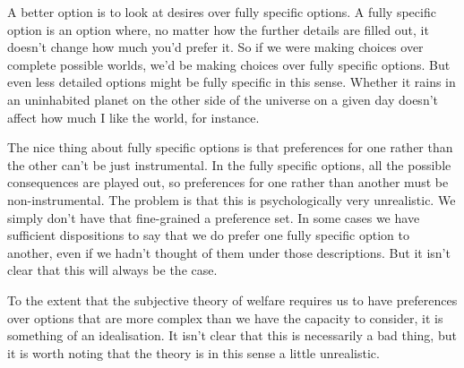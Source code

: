 A better option is to look at desires over fully specific options. A fully specific option is an option where, no matter how the further details are filled out, it doesn't change how much you'd prefer it. So if we were making choices over complete possible worlds, we'd be making choices over fully specific options. But even less detailed options might be fully specific in this sense. Whether it rains in an uninhabited planet on the other side of the universe on a given day doesn't affect how much I like the world, for instance.

The nice thing about fully specific options is that preferences for one rather than the other can't be just instrumental. In the fully specific options, all the possible consequences are played out, so preferences for one rather than another must be non-instrumental. The problem is that this is psychologically very unrealistic. We simply don't have that fine-grained a preference set. In some cases we have sufficient dispositions to say that we do prefer one fully specific option to another, even if we hadn't thought of them under those descriptions. But it isn't clear that this will always be the case.

To the extent that the subjective theory of welfare requires us to have preferences over options that are more complex than we have the capacity to consider, it is something of an idealisation. It isn't clear that this is necessarily a bad thing, but it is worth noting that the theory is in this sense a little unrealistic.